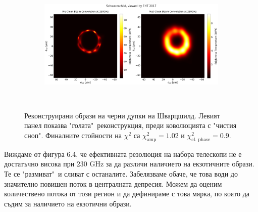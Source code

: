 \documentclass[12pt]{article}
\numberwithin{equation}{section}
\numberwithin{figure}{section}
\begin{document}
	\begin{figure}[h!]
		\centering
		\begin{subfigure}{12cm}
			\hspace{-1.5cm}
			\includegraphics[scale = 0.23]{Section_8_Observing_Horizonless_Objects/Ehtim_plot_2017_no_blur_Sch.png}
		\end{subfigure}\\
		\label{Kerr_EHT_2017}
		\caption[Реконструирани образи на черни дупки на Шварцшилд.]{\small Реконструирани образи на черни дупки на Шварцшилд. Левият панел показва "голата"$\,$ реконструкция, преди коволюцията с "чистия сноп". Финалните стойности на $\chi^2$ са $\chi^2_\text{amp} = 1.02$ и $\chi^2_\text{cl. phase} = 0.9$.} 
	\end{figure}
	
	Виждаме от фигура 6.4, че ефективната резолюция на набора телескопи не е достатъчно висока при $230$ GHz за да различи наличието на екзотичните образи. Те се "размиват"$\,$ и сливат с останалите. Забелязваме обаче, че това води до значително повишен поток в централната депресия. Можем да оценим количествено потока от този регион и да дефинираме с това мярка, по която да съдим за наличието на екзотични образи. 
	
\end{document}
